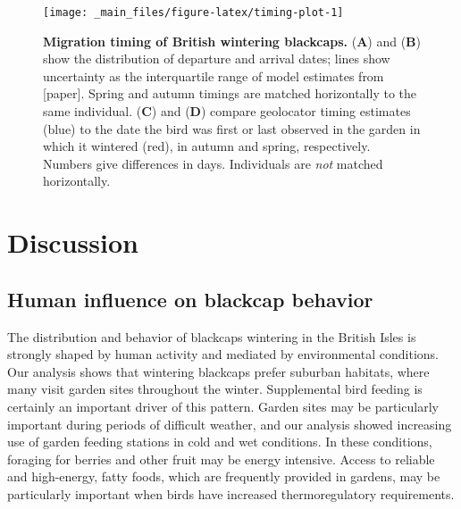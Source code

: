 \documentclass[a4paper, nobind]{templates/ociamthesis}
\begin{document}
\begin{figure}
\texttt{[image: \_main\_files/figure-latex/timing-plot-1]} \caption{\textbf{Migration timing of British wintering blackcaps.} (\textbf{A}) and (\textbf{B}) show the distribution of departure and arrival dates; lines show uncertainty as the interquartile range of model estimates from {[}paper{]}. Spring and autumn timings are matched horizontally to the same individual. (\textbf{C}) and (\textbf{D}) compare geolocator timing estimates (blue) to the date the bird was first or last observed in the garden in which it wintered (red), in autumn and spring, respectively. Numbers give differences in days. Individuals are \emph{not} matched horizontally.}\label{fig:timing-plot}
\end{figure}

\hypertarget{discussion}{%
\section{Discussion}\label{discussion}}

\hypertarget{human-influence-on-blackcap-behavior}{%
\subsection{Human influence on blackcap behavior}\label{human-influence-on-blackcap-behavior}}

The distribution and behavior of blackcaps wintering in the British Isles is strongly shaped by human activity and mediated by environmental conditions. Our analysis shows that wintering blackcaps prefer suburban habitats, where many visit garden sites throughout the winter. Supplemental bird feeding is certainly an important driver of this pattern. Garden sites may be particularly important during periods of difficult weather, and our analysis showed increasing use of garden feeding stations in cold and wet conditions. In these conditions, foraging for berries and other fruit may be energy intensive. Access to reliable and high-energy, fatty foods, which are frequently provided in gardens, may be particularly important when birds have increased thermoregulatory requirements.
\end{document}
